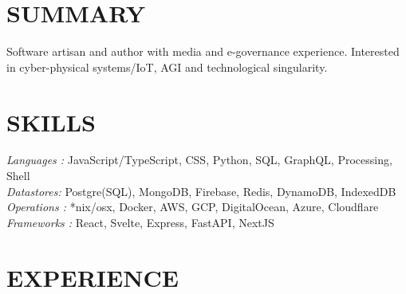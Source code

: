 \documentclass[margin, 10pt]{res} %
\begin{document}
\begin{resume}

\section{\ttfamily SUMMARY}  
Software artisan and author with media and e-governance experience. Interested in cyber-physical systems/IoT, AGI and technological singularity.

\section{\ttfamily \color{Black} SKILLS} 

{\sl Languages :} JavaScript/TypeScript, CSS, Python, SQL, GraphQL, Processing, Shell\\
\smallskip\smallskip
{\sl Datastores:} Postgre(SQL), MongoDB, Firebase, Redis, DynamoDB, IndexedDB\\
\smallskip
{\sl Operations :} *nix/osx, Docker, AWS, GCP, DigitalOcean, Azure, Cloudflare\\
\smallskip
{\sl Frameworks :} React, Svelte, Express, FastAPI, NextJS\\


\section{\ttfamily EXPERIENCE}


\end{resume}
\end{document}
